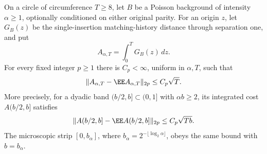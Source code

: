 \documentclass[11pt,letterpaper]{article}
\begin{document}
\begin{theorem}
\label{thm:Poisson-integrated-capture}
On a circle of circumference $T\ge8$, let $B$ be a Poisson
background of intensity $\alpha\ge1$, optionally conditioned
on either original parity. For an origin $z$, let $G_B(z)$
be the single-insertion matching-history distance through
separation one, and put
\[
 A_{\alpha,T}=\int_0^T G_B(z)\,dz.
\]
For every fixed integer $p\ge1$ there is $C_p<\infty$,
uniform in $\alpha,T$, such that
\begin{equation}\label{eq:integrated-capture-moments}
 \|A_{\alpha,T}-\EE A_{\alpha,T}\|_{2p}\le C_p\sqrt T.
\end{equation}
More precisely, for a dyadic band $(b/2,b]\subset(0,1]$
with $\alpha b\ge2$, its integrated cost $A(b/2,b]$ satisfies
\begin{equation}\label{eq:integrated-capture-band-moments}
 \|A(b/2,b]-\EE A(b/2,b]\|_{2p}\le C_p\sqrt{Tb}.
\end{equation}
The microscopic strip $[0,b_\alpha]$, where
$b_\alpha=2^{-\lfloor\log_2\alpha\rfloor}$, obeys the same
bound with $b=b_\alpha$.
\end{theorem}
\end{document}
